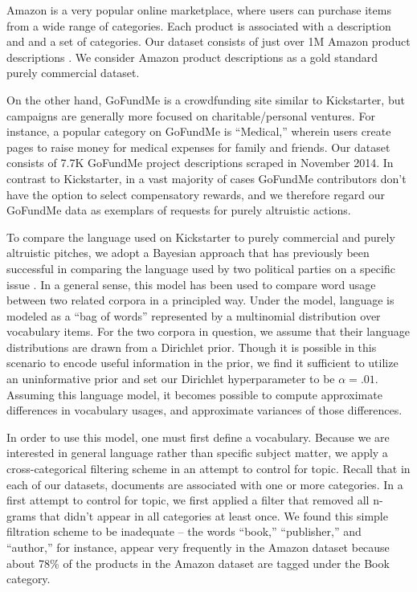 \documentclass[letterpaper]{article}
\begin{document}
Amazon is a very popular online marketplace, where users can purchase items from a wide range of categories. Each product is associated with a description and and a set of categories. Our dataset consists of just over 1M Amazon product descriptions \cite{mcauley2013hidden}. We consider Amazon product descriptions as a gold standard purely commercial dataset.

On the other hand, GoFundMe is a crowdfunding site similar to Kickstarter, but campaigns are generally more focused on charitable/personal ventures. For instance, a popular category on GoFundMe is ``Medical,'' wherein users create pages to raise money for medical expenses for family and friends. Our dataset consists of 7.7K GoFundMe project descriptions scraped in November 2014. In contrast to Kickstarter, in a vast majority of cases GoFundMe contributors don't have the option to select compensatory rewards, and we therefore regard our GoFundMe data as exemplars of requests for purely altruistic actions.

To compare the language used on Kickstarter to purely commercial and purely altruistic pitches, we adopt a Bayesian approach that has previously been successful in comparing the language used by two political parties on a specific issue \cite{monroe2008fightin}. In a general sense, this model has been used to compare word usage between two related corpora in a principled way. Under the model, language is modeled as a ``bag of words'' represented by a multinomial distribution over vocabulary items. For the two corpora in question, we assume that their language distributions are drawn from a Dirichlet prior. Though it is possible in this scenario to encode useful information in the prior, we find it sufficient to utilize an uninformative prior and set our Dirichlet hyperparameter to be $\alpha=.01$. Assuming this language model, it becomes possible to compute approximate differences in vocabulary usages, and approximate variances of those differences.

In order to use this model, one must first define a vocabulary. Because we are interested in general language rather than specific subject matter, we apply a cross-categorical filtering scheme in an attempt to control for topic. Recall that in each of our datasets, documents are associated with one or more categories. In a first attempt to control for topic, we first applied a filter that removed all n-grams that didn't appear in all categories at least once. We found this simple filtration scheme to be inadequate -- the words ``book,'' ``publisher,'' and ``author,'' for instance, appear very frequently in the Amazon dataset because about 78\% of the products in the Amazon dataset are tagged under the Book category.
\end{document}
